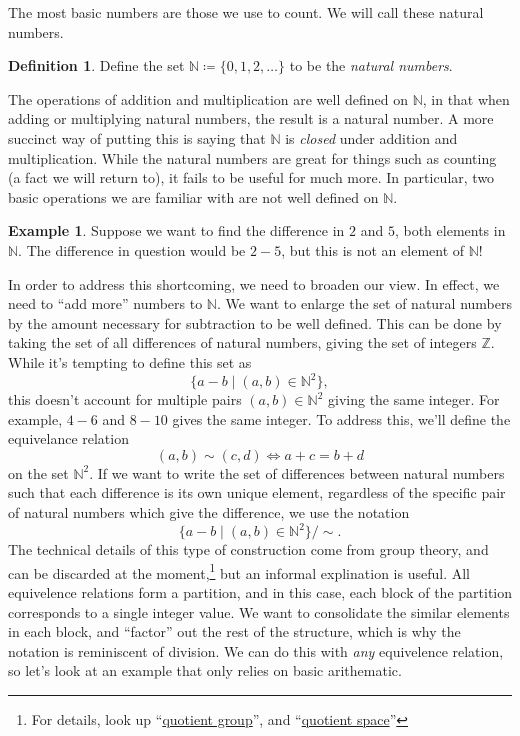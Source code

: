 \documentclass{article}
\newcommand{\N}{\mathbb{N}}
\newcommand{\Z}{\mathbb{Z}}
\theoremstyle{definition}
\newtheorem{definition}{Definition}[section]
\newtheorem{example}{Example}[section]
\begin{document}
	The most basic numbers are those we use to count. We will call these natural numbers. 
	\begin{definition}\label{def}
		Define the set $ \N\coloneqq\{0,1,2,\ldots\} $ to be the \textit{{\color{red} natural numbers}}. 
	\end{definition}
	The operations of addition and multiplication are well defined on $ \N $, in that when adding or multiplying natural numbers, the result is a natural number. A more succinct way of putting this is saying that $ \N $ is \textit{closed} under addition and multiplication. While the natural numbers are great for things such as counting (a fact we will return to), it fails to be useful for much more. In particular, two basic operations we are familiar with are not well defined on $ \N $.
	\begin{example}
		Suppose we want to find the difference in $ 2 $ and $ 5 $, both elements in $ \N $. The difference in question would be $ 2-5 $, but this is not an element of $ \N $! 
	\end{example}
	
	In order to address this shortcoming, we need to broaden our view. In effect, we need to ``add more'' numbers to $ \N $. We want to enlarge the set of natural numbers by the amount necessary for subtraction to be well defined. This can be done by taking the set of all differences of natural numbers, giving the set of integers $\Z$. While it's tempting to define this set as $$\{a-b\mid(a,b)\in\N^2\},$$ this doesn't account for multiple pairs $(a,b)\in \N^2$ giving the same integer. For example, $4 - 6$ and $8-10$ gives the same integer. To address this, we'll define the equivelance relation $$ (a,b)\sim(c,d) \iff  a+c=b+d $$ on the set $\N^2$. If we want to write the set of differences between natural numbers such that each difference is its own unique element, regardless of the specific pair of natural numbers which give the difference, we use the notation 
	$$ \{a-b\mid(a,b)\in\N^2\}/\sim. $$
	The technical details of this type of construction come from group theory, and can be discarded at the moment,\footnote{For details, look up ``\href{https://www.math3ma.com/blog/whats-a-quotient-group-really-part-1}{quotient group}'', and ``\href{https://www3.nd.edu/~jdiller/teaching/archive/spring12_20820/quotient-spaces.pdf}{quotient space}''} but an informal explination is useful. All equivelence relations form a partition, and in this case, each block of the partition corresponds to a single integer value. We want to consolidate the similar elements in each block, and ``factor'' out the rest of the structure, which is why the notation is reminiscent of division. We can do this with \textit{any} equivelence relation, so let's look at an example that only relies on basic arithematic. 
	
\end{document}
